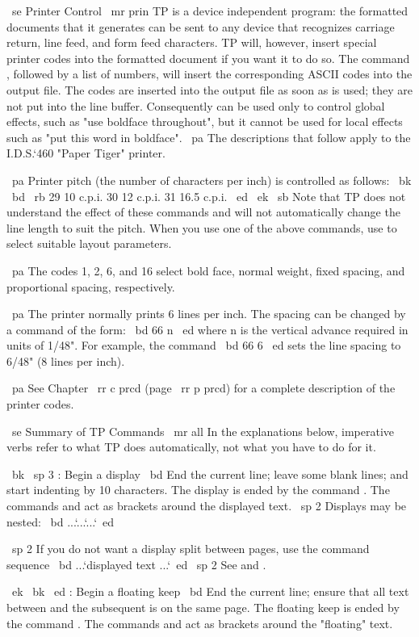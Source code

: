 ~se Printer Control
~mr prin
TP is a device independent program: the formatted documents that it generates
can be sent to any device that recognizes carriage return, line feed, and
form feed characters.
TP will, however, insert special printer codes into the formatted document
if you want it to do so.
The command \CC, followed by a list of numbers, will insert the corresponding
ASCII codes into the output file.
The codes are inserted into the output file as soon as \CC is used; they are
not put into the line buffer.
Consequently \CC can be used only to control global effects, such as
"use boldface throughout", but it cannot be used for local effects
such as "put this word in boldface".
~pa The descriptions that follow apply to the I.D.S.`460 "Paper Tiger"
printer.

~pa Printer pitch (the number of characters per inch) is controlled as
follows:
~bk ~bd ~rb
29              10 c.p.i.
30              12 c.p.i.
31              16.5 c.p.i.
~ed ~ek ~sb
Note that TP does not understand the effect of these commands and will not
automatically change the line length to suit the pitch.
When you use one of the above commands, use \HL to select suitable layout
parameters.

~pa The codes 1, 2, 6, and 16 select bold face, normal weight, fixed spacing, 
and proportional spacing, respectively.

~pa The printer normally prints 6 lines per inch.
The spacing can be changed by a \CC command of the form: ~bd  66 n ~ed
where n is the vertical advance required in units of 1/48".
For example, the command
~bd  66 6 ~ed
sets the line spacing to 6/48" (8 lines per inch).

~pa See Chapter ~rr c prcd (page ~rr p prcd) for a complete 
description of the printer codes.

~se Summary of TP Commands
~mr all
In the explanations below, imperative verbs refer to what TP does
automatically, not what you have to do for it.

~bk ~sp 3 \BD: Begin a display
~bd
End the current line; leave some blank lines; and
start indenting by 10 characters.
The display is ended by the command \ED.
The commands \BD and \ED act as brackets around the displayed text.
~sp 2 Displays may be nested:
~bd \BD ...`\BD ...`\ED ...`\ED ~ed

~sp 2 If you do not want a display split between pages, use the command 
sequence ~bd \BD \BK ...`displayed text ...`\EK \ED ~ed
~sp 2 See \DL and \LS.

~ek ~bk ~ed \BF: Begin a floating keep
~bd
End the current line; ensure that all text between \BF and the 
subsequent \EF is on the same page.
The floating keep is ended by the command \EF.
The commands \BF and \EF act as brackets around the "floating" text.

